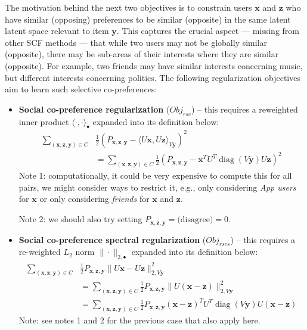 \documentclass[11pt,a4paper]{article}
\newcommand{\Obj}{\mathit{Obj}}
\newcommand{\rsc}{\mathit{rsc}}
\newcommand{\rscs}{\mathit{rscs}}
\newcommand{\diag}{\operatorname{diag}}
\newcommand{\x}{\vec{x}}
\newcommand{\y}{\vec{y}}
\newcommand{\z}{\vec{z}}
\newcommand{\la}{\langle}
\newcommand{\ra}{\rangle}
\renewcommand{\vec}[1]{\mathbf{#1}}
\newcommand{\subfive}{\hspace{2.5mm}}
\begin{document}
The motivation behind the next two objectives is to constrain users $\x$
and $\z$ who have similar (opposing) 
preferences to be similar (opposite) in the same latent latent space
relevant to item $\y$.  This captures the crucial aspect --- missing from 
other SCF methods --- that while two users may not be globally similar (opposite),
there may be sub-areas of their interests where they are similar (opposite).
For example, two friends may have similar interests concerning music, but 
different interests concerning politics.  The following regularization objectives
aim to learn such selective co-preferences:
\begin{itemize}
\item {\bf Social co-preference regularization} ($\Obj_\rsc$)
-- this requires a reweighted inner product $\la \cdot, \cdot \ra_{\bullet}$
expanded into its definition below:
\begin{align}
\sum_{(\x,\z,\y) \in C} & \frac{1}{2} (P_{\x,\z,\y} - \la U\x, U\z \ra_{V\y})^2 \nonumber \\
& = \sum_{(\x,\z,\y) \in C} \frac{1}{2} (P_{\x,\z,\y} - \x^T U^T \diag(V\y) U \z)^2
\end{align}
\subfive Note 1: computationally, it could be very expensive to compute this
for all pairs, we might consider ways to restrict it, e.g., only considering
\emph{App users} for $\x$ or only considering \emph{friends} for $\x$ and $\z$.

\subfive Note 2: we should also try setting $P_{\x,\z,\y} = \mbox{(disagree)} = 0$.
\item {\bf Social co-preference spectral regularization}
($\Obj_\rscs$) -- this requires a re-weighted $L_2$ norm 
$\| \cdot \|_{2,\bullet}$ expanded into its definition below:
\begin{align}
\sum_{(\x,\z,\y) \in C} & \frac{1}{2} P_{\x,\z,\y} \| U\x - U\z \|_{2,V\y}^2 \nonumber \\
& = \sum_{(\x,\z,\y) \in C} \frac{1}{2} P_{\x,\z,\y} \| U (\x - \z) \|_{2,V\y}^2 \nonumber \\
& = \sum_{(\x,\z,\y) \in C} \frac{1}{2} P_{\x,\z,\y} (\x - \z)^T U^T \diag(V\y) U (\x - \z)
\end{align}
\subfive Note: see notes 1 and 2 for the previous case that also apply here.
\end{itemize}
\end{document}
